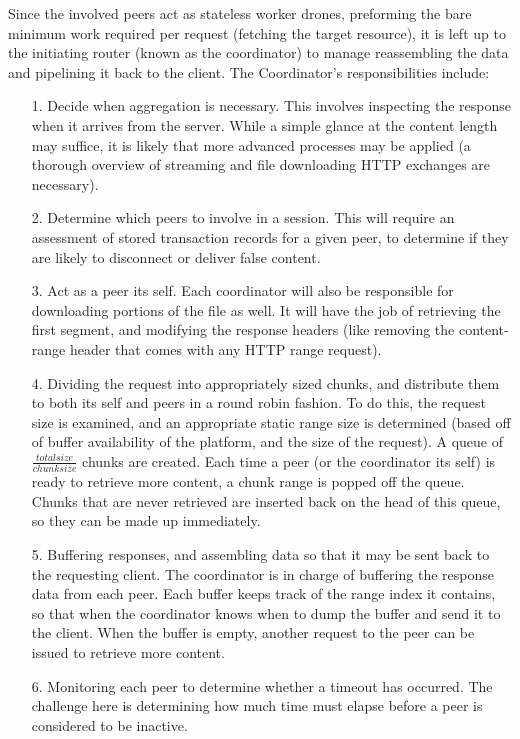 \documentclass[12pt]{article}
\begin{document}
			Since the involved peers act as stateless worker drones, preforming the bare minimum work required per request (fetching the target resource), it is left up to the initiating router (known as the coordinator) to manage reassembling the data and pipelining it back to the client. The Coordinator's responsibilities include: 
			\begin{itemize}
				\item[1.] Decide when aggregation is necessary. This involves inspecting the response when it arrives from the server. While a simple glance at the content length may suffice, it is likely that more advanced processes may be applied (a thorough overview of streaming and file downloading HTTP exchanges are necessary).
				\item[2.] Determine which peers to involve in a session. This will require an assessment of stored transaction records for a given peer, to determine if they are likely to disconnect or deliver false content. 
				\item[3.] Act as a peer its self. Each coordinator will also be responsible for downloading portions of the file as well. It will have the job of retrieving the first segment, and modifying the response headers (like removing the content-range header that comes with any HTTP range request).
				\item[4.] Dividing the request into appropriately sized chunks, and distribute them to both its self and peers in a round robin fashion. To do this, the request size is examined, and an appropriate static range size is determined (based off of buffer availability of the platform, and the size of the request). A queue of $\frac{total size}{chunk size}$ chunks are created. Each time a peer (or the coordinator its self) is ready to retrieve more content, a chunk range is popped off the queue. Chunks that are never retrieved are inserted back on the head of this queue, so they can be made up immediately.
				\item[5.] Buffering responses, and assembling data so that it may be sent back to the requesting client. The coordinator is in charge of buffering the response data from each peer. Each buffer keeps track of the range index it contains, so that when the coordinator knows when to dump the buffer and send it to the client. When the buffer is empty, another request to the peer can be issued to retrieve more content.
				\item[6.] Monitoring each peer to determine whether a timeout has occurred. The challenge here is determining how much time must elapse before a peer is considered to be inactive. 

\end{itemize}
\end{document}
